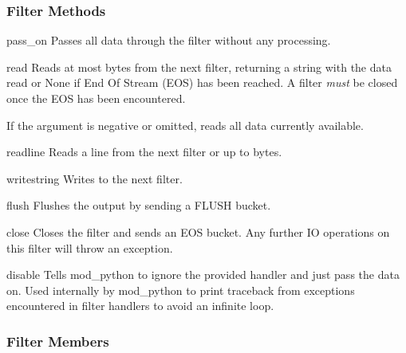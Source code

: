 \subsubsection{Filter Methods\label{pyapi-mpfilt-meth}}

\begin{methoddesc}[filter]{pass_on}{}
  Passes all data through the filter without any processing.
\end{methoddesc}

\begin{methoddesc}[filter]{read}{}
  Reads at most  bytes from the next filter, returning a string
  with the data read or None if End Of Stream (EOS) has been reached. A
  filter \emph{must} be closed once the EOS has been encountered.

  If the  argument is negative or omitted, reads all data
  currently available.
\end{methoddesc}

\begin{methoddesc}[filter]{readline}{}
  Reads a line from the next filter or up to  bytes.
\end{methoddesc}

\begin{methoddesc}[filter]{write}{string}
  Writes  to the next filter.
\end{methoddesc}

\begin{methoddesc}[filter]{flush}{}
  Flushes the output by sending a FLUSH bucket.
\end{methoddesc}

\begin{methoddesc}[filter]{close}{}
  Closes the filter and sends an EOS bucket. Any further IO operations on
  this filter will throw an exception.
\end{methoddesc}

\begin{methoddesc}[filter]{disable}{}
  Tells mod_python to ignore the provided handler and just pass the data
  on. Used internally by mod_python to print traceback from exceptions
  encountered in filter handlers to avoid an infinite loop.
\end{methoddesc}

\subsubsection{Filter Members\label{pyapi-mpfilt-mem}}


